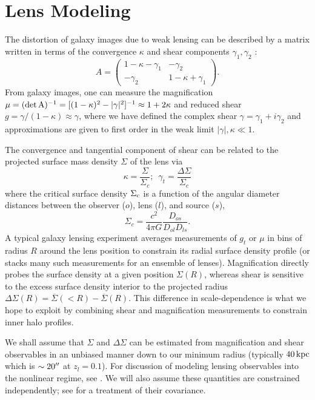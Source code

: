 \documentclass[12pt]{emulateapj}
\begin{document}
\section{Lens Modeling}

The distortion of galaxy images due to weak lensing can be described
by a matrix written in terms of the convergence $\kappa$ and shear
components $\gamma_1, \gamma_2$ \citep[e.g.][]{Bartelmann2001}:
\begin{equation}
A = \left( \begin{array}{cc}
1 - \kappa -\gamma_1 & -\gamma_2 \\
-\gamma_2 & 1 - \kappa + \gamma_1 \end{array} \right).
\end{equation}
From galaxy images, one can measure the magnification 
$\mu = (\rm{det}\,A)^{-1} = [(1-\kappa)^2 - |\gamma|^2]^{-1} \approx 1+2\kappa$
and reduced shear $g = \gamma / (1-\kappa) \approx \gamma$, where we have defined the
complex shear $\gamma=\gamma_1 + i\gamma_2$ and approximations are
given to first order in the weak limit $|\gamma|,\kappa \ll 1$.

The convergence and tangential component of shear can be related to the
projected surface mass density $\Sigma$ of the lens via
\begin{equation}
\kappa = \frac{\Sigma}{\Sigma_c}; \,\,\, \gamma_t = \frac{\Delta\Sigma}{\Sigma_c}
\end{equation}
where the critical surface density $\Sigma_{\rm  c}$ is a function of
the angular diameter distances between the observer ($o$), lens ($l$),
and source ($s$),
\begin{equation}
\Sigma_{c}=\frac{c^2}{4\pi G}\frac{D_{os}}{D_{ol}D_{ls}}.
\end{equation}
A typical galaxy lensing experiment averages measurements of $g_t$ or $\mu$ in
bins of radius $R$ around the lens position to constrain its radial
surface density profile (or stacks many such measurements for an
ensemble of lenses). Magnification directly probes the surface density
at a given position $\Sigma(R)$, whereas shear is sensitive to the
excess surface density interior to the projected radius
$\Delta\Sigma(R) = \overline{\Sigma}(<R) - \overline{\Sigma}(R)$. This
difference in scale-dependence is what we hope to exploit by combining
shear and magnification measurements to constrain inner halo profiles.

We shall assume that $\Sigma$ and $\Delta\Sigma$ can be estimated from
magnification and shear observables in an unbiased manner down to our
minimum radius (typically $40\,\rm{kpc}$ which is $\sim20\mbox{$^{\prime\prime}$}$ at
$z_l=0.1$). For discussion of modeling lensing observables into the
nonlinear regime, see \citet{Menard2003, Takada2003,
  Mandelbaum2006}. We will also assume these quantities are
constrained independently; see \citet{Rozo2010} for a treatment of
their covariance.
\end{document}
